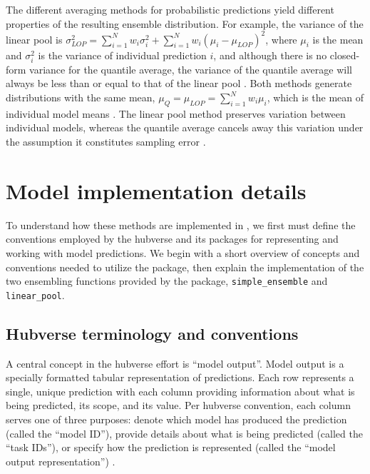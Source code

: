 \documentclass[
  article,
  shortnames,
  notitle]{jss}
\begin{document}
The different averaging methods for probabilistic predictions yield
different properties of the resulting ensemble distribution. For
example, the variance of the linear pool is
\(\sigma^2_{LOP} = \sum_{i=1}^Nw_i\sigma_i^2 + \sum_{i=1}^Nw_i(\mu_i-\mu_{LOP})^2\),
where \(\mu_i\) is the mean and \(\sigma^2_i\) is the variance of
individual prediction \(i\), and although there is no closed-form
variance for the quantile average, the variance of the quantile average
will always be less than or equal to that of the linear pool
\citep{lichtendahl2013}. Both methods generate distributions with the
same mean, \(\mu_Q = \mu_{LOP} = \sum_{i=1}^Nw_i\mu_i\), which is the
mean of individual model means \citep{lichtendahl2013}. The linear pool
method preserves variation between individual models, whereas the
quantile average cancels away this variation under the assumption it
constitutes sampling error \citep{howerton2023}.

\section{Model implementation details}\label{sec-implementation}

To understand how these methods are implemented in ,
we first must define the conventions employed by the hubverse and its
packages for representing and working with model predictions. We begin
with a short overview of concepts and conventions needed to utilize the
 package, then explain the implementation of the two
ensembling functions provided by the package, \texttt{simple\_ensemble}
and \texttt{linear\_pool}.

\subsection{Hubverse terminology and
conventions}\label{hubverse-terminology-and-conventions}

A central concept in the hubverse effort is ``model output''. Model
output is a specially formatted tabular representation of predictions.
Each row represents a single, unique prediction with each column
providing information about what is being predicted, its scope, and its
value. Per hubverse convention, each column serves one of three
purposes: denote which model has produced the prediction (called the
``model ID''), provide details about what is being predicted (called the
``task IDs''), or specify how the prediction is represented (called the
``model output representation'') \citep{hubverse_docs}.
\end{document}
